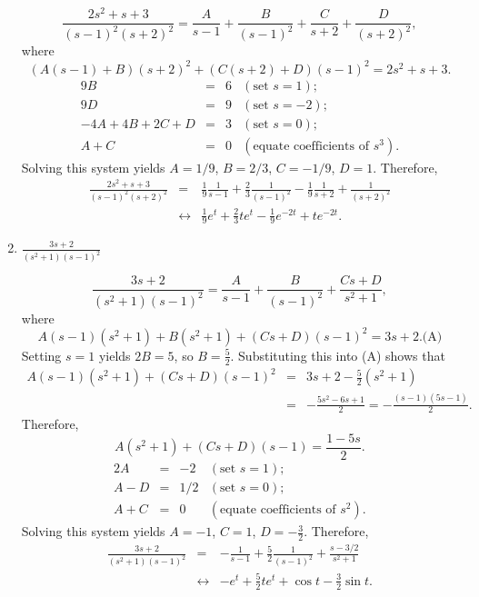 \documentclass{ximera}
\begin{document}
\begin{problem}
\begin{enumerate}
\begin{solution}
$$
\frac{2s^2+s+3}{(s-1)^2(s+2)^2}=
\frac{A}{s-1}+\frac{B}{(s-1)^2}+\frac{C}{s+2}+\frac{D}{(s+2)^2},
$$
where
$$
(A(s-1)+B)(s+2)^2+(C(s+2)+D)(s-1)^2=2s^2+s+3.
$$
$$
\begin{array}{rcrl}
9B&=&6&(\mbox{set }s=1);\\
9D&=&9& (\mbox{set }s=-2);\\
-4A+4B+2C+D&=&3&(\mbox{set }s=0);\\
A+C&=&0&(\mbox{equate coefficients of }s^3).
\end{array}
$$
Solving this system yields
$A=1/9$, $B=2/3$, $C=-1/9$, $D=1$.
Therefore,
\begin{eqnarray*}
\frac{2s^2+s+3}{(s-1)^2(s+2)^2}&=&
\frac{1}{9}\frac{1}{s-1}+\frac{2}{3}\frac{1}{(s-1)^2}-\frac{1}{9}\frac{1}{s+2}+\frac{1}{(s+2)^2}\\
&\leftrightarrow&
\frac{1}{9}e^t+\frac{2}{3}te^t-\frac{1}{9}e^{-2t}+te^{-2t}.
\end{eqnarray*}
\end{solution}
    
    \item $\frac{3s+2}{(s^2+1)(s-1)^2}$

\begin{solution}
$$
\frac{3s+2}{(s^2+1)(s-1)^2}=\frac{A}{s-1}+\frac{B}{(s-1)^2}+
\frac{Cs+D}{s^2+1},
$$
where
$$
A(s-1)(s^2+1)+B(s^2+1)+(Cs+D)(s-1)^2=3s+2.
\text{(A)}
$$
Setting $s=1$ yields $2B=5$, so $B=\frac{5}{2}$.
Substituting this into (A) shows that
\begin{eqnarray*}
A(s-1)(s^2+1)+(Cs+D)(s-1)^2&=&3s+2-\frac{5}{2}(s^2+1)\\
&=&-\frac{5s^2-6s+1}{2}=-\frac{(s-1)(5s-1)}{2}.
\end{eqnarray*}
Therefore,
$$
A(s^2+1)+(Cs+D)(s-1)=\frac{1-5s}{2}.
$$
$$
\begin{array}{rcrl}
2A&=&-2&(\mbox{set }s=1);\\
A-D&=&1/2&(\mbox{set }s=0);\\
A+C&=&0&(\mbox{equate coefficients of }s^2).
\end{array}
$$
Solving this system yields $A=-1$, $C=1$,
$D=-\frac{3}{2}$. Therefore,
\begin{eqnarray*}
\frac{3s+2}{(s^2+1)(s-1)^2}&=&-\frac{1}{s-1}+\frac{5}{2}\frac{1}{(s-1)^2}
+\frac{s-3/2}{s^2+1}\\
&\leftrightarrow&
-e^t+\frac{5}{2}te^t+\cos t-\frac{3}{2}\sin t.
\end{eqnarray*}
\end{solution}
\end{enumerate}
\end{problem}
\end{document}
